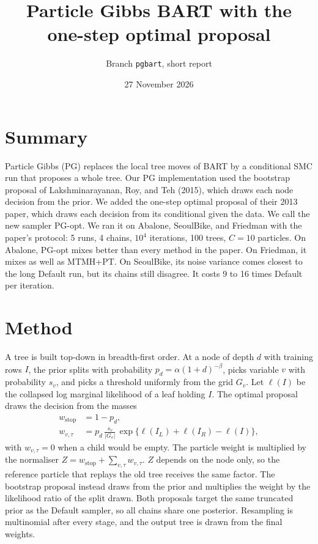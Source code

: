 \documentclass[11pt]{article}
\title{Particle Gibbs BART with the one-step optimal proposal}
\author{Branch \texttt{pgbart}, short report}
\date{27 November 2026}
\begin{document}
\maketitle

\section{Summary}

Particle Gibbs (PG) replaces the local tree moves of BART by a conditional SMC run that proposes a whole tree.
Our PG implementation used the bootstrap proposal of Lakshminarayanan, Roy, and Teh (2015), which draws each node decision from the prior.
We added the one-step optimal proposal of their 2013 paper, which draws each decision from its conditional given the data.
We call the new sampler PG-opt.
We ran it on Abalone, SeoulBike, and Friedman with the paper's protocol: 5 runs, 4 chains, $10^4$ iterations, 100 trees, $C=10$ particles.
On Abalone, PG-opt mixes better than every method in the paper.
On Friedman, it mixes as well as MTMH+PT.
On SeoulBike, its noise variance comes closest to the long Default run, but its chains still disagree.
It costs 9 to 16 times Default per iteration.

\section{Method}

A tree is built top-down in breadth-first order.
At a node of depth $d$ with training rows $I$, the prior splits with probability $p_d = \alpha(1+d)^{-\beta}$, picks variable $v$ with probability $s_v$, and picks a threshold uniformly from the grid $G_v$.
Let $\ell(I)$ be the collapsed log marginal likelihood of a leaf holding $I$.
The optimal proposal draws the decision from the masses
\begin{align*}
  w_{\text{stop}} &= 1 - p_d, \\
  w_{v,\tau} &= p_d \, \frac{s_v}{|G_v|} \, \exp\bigl\{\ell(I_L) + \ell(I_R) - \ell(I)\bigr\},
\end{align*}
with $w_{v,\tau}=0$ when a child would be empty.
The particle weight is multiplied by the normaliser $Z = w_{\text{stop}} + \sum_{v,\tau} w_{v,\tau}$.
$Z$ depends on the node only, so the reference particle that replays the old tree receives the same factor.
The bootstrap proposal instead draws from the prior and multiplies the weight by the likelihood ratio of the split drawn.
Both proposals target the same truncated prior as the Default sampler, so all chains share one posterior.
Resampling is multinomial after every stage, and the output tree is drawn from the final weights.
\end{document}
